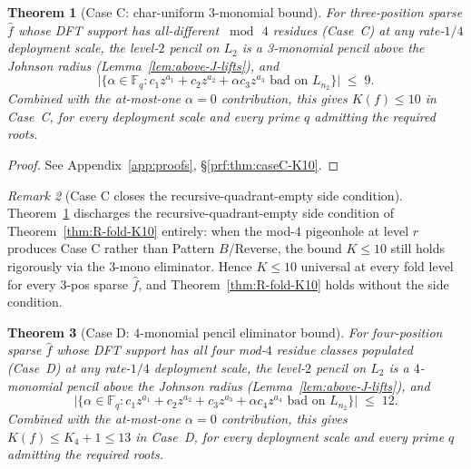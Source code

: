 \documentclass[11pt]{article}
\newtheorem{theorem}{Theorem}[section]
\theoremstyle{definition}
\theoremstyle{remark}
\newtheorem{remark}[theorem]{Remark}
\newcommand{\FF}{\mathbb{F}}
\begin{document}
\begin{theorem}[Case C: char-uniform 3-monomial bound]
\label{thm:caseC-K10}
For three-position sparse $\hat f$ whose DFT support has all-different
$\bmod\,4$ residues (Case~C) at any rate-$1/4$ deployment scale, the
level-$2$ pencil on $L_2$ is a 3-monomial pencil above the Johnson
radius (Lemma~\ref{lem:above-J-lifts}), and
\[
 \bigl|\{\alpha \in \FF_q :
   c_1 z^{a_1} + c_2 z^{a_2} + \alpha c_3 z^{a_3} \text{ bad on } L_{n_2}\}\bigr|
 \;\leq\; 9.
\]
Combined with the at-most-one $\alpha = 0$ contribution, this gives
$K(f) \leq 10$ in Case~C, for every deployment scale and every prime
$q$ admitting the required roots.
\end{theorem}

\begin{proof}[Proof] See Appendix~\ref{app:proofs}, \S\ref{prf:thm:caseC-K10}.\end{proof}

\begin{remark}[Case C closes the recursive-quadrant-empty side condition]
\label{rem:caseC-closes-P2prime}
Theorem~\ref{thm:caseC-K10} discharges the recursive-quadrant-empty
side condition of Theorem~\ref{thm:R-fold-K10} entirely:
when the mod-$4$ pigeonhole at level $r$ produces Case C rather than
Pattern $B$/Reverse, the bound $K \leq 10$ still holds rigorously
via the $3$-mono eliminator. Hence $K \leq 10$ universal at every
fold level for every $3$-pos sparse $\hat f$, and
Theorem~\ref{thm:R-fold-K10} holds without the side condition.
\end{remark}

\begin{theorem}[Case D: $4$-monomial pencil eliminator bound]
\label{thm:caseD-K12}
For four-position sparse $\hat f$ whose DFT support has all four mod-$4$
residue classes populated (Case~D) at any rate-$1/4$ deployment scale,
the level-$2$ pencil on $L_2$ is a $4$-monomial pencil above the Johnson
radius (Lemma~\ref{lem:above-J-lifts}), and
\[
 \bigl|\{\alpha \in \FF_q :
   c_1 z^{a_1} + c_2 z^{a_2} + c_3 z^{a_3} + \alpha c_4 z^{a_4}
     \text{ bad on } L_{n_2}\}\bigr|
 \;\leq\; 12.
\]
Combined with the at-most-one $\alpha = 0$ contribution, this gives
$K(f) \leq K_4 + 1 \leq 13$ in Case~D, for every deployment scale and
every prime $q$ admitting the required roots.
\end{theorem}
\end{document}
